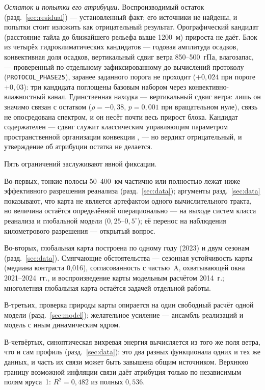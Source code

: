 \documentclass[11pt,a4paper]{article}
\begin{document}
\emph{Остаток и попытки его атрибуции.} Воспроизводимый остаток (разд.~\ref{sec:residual}) --- установленный факт; его источники не найдены, и попытки стоит изложить как отрицательный результат. Орографический кандидат (расстояние тайла до ближайшего рельефа выше 1200~м) прироста не даёт. Блок из четырёх гидроклиматических кандидатов --- годовая амплитуда осадков, конвективная доля осадков, вертикальный сдвиг ветра 850--500~гПа, влагозапас, --- проверенный по отдельному зафиксированному до вычислений протоколу (\texttt{PROTOCOL\_PHASE25}), заранее заданного порога не проходит ($+0{,}024$ при пороге $+0{,}03$): три кандидата поглощены базовым набором через конвективно-влажностный канал. Единственная находка --- вертикальный сдвиг ветра: лишь он значимо связан с остатком ($\rho=-0{,}38$, $p=0{,}001$ при вращательном нуле), связь не опосредована спектром, и он несёт почти весь прирост блока. Кандидат содержателен --- сдвиг служит классическим управляющим параметром пространственной организации конвекции \cite{RotunnoKlempWeisman1988,Wing2017}, --- но вердикт отрицательный, и утверждение об атрибуции остатка не делается.

Пять ограничений заслуживают явной фиксации.

Во-первых, тонкие полосы 50--400~км частично или полностью лежат ниже эффективного разрешения реанализа (разд.~\ref{sec:data}); аргументы разд.~\ref{sec:data} показывают, что карта не является артефактом одного вычислительного тракта, но величина остаётся определённой операционально --- на выходе систем класса реанализа и глобальной модели ($0{,}25$--$0{,}5^\circ$); её перенос на наблюдения километрового разрешения --- открытый вопрос.

Во-вторых, глобальная карта построена по одному году (2023) и двум сезонам (разд.~\ref{sec:data}). Смягчающие обстоятельства --- сезонная устойчивость карты (медиана контраста 0,016), согласованность с частью~A, охватывающей окна 2021--2024~гг., и воспроизведение карты модельным расчётом 2014~г.; многолетняя глобальная карта остаётся задачей отдельной работы.

В-третьих, проверка природы карты опирается на один свободный расчёт одной модели (разд.~\ref{sec:model}); желательное усиление --- ансамбль реализаций и модель с иным динамическим ядром.

В-четвёртых, синоптическая вихревая энергия вычисляется из того же поля ветра, что и сам профиль (разд.~\ref{sec:data}): это два разных функционала одних и тех же данных, и часть их связи может быть завышена общим источником. Верхнюю границу возможной инфляции связи даёт атрибуция только по независимым полям яруса~1: $R^2=0{,}482$ из полных $0{,}536$.
\end{document}
